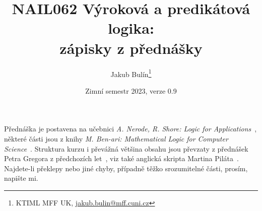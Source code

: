 \title{NAIL062 Výroková a predikátová logika: \\ zápisky z přednášky}
\author{Jakub Bulín\footnote{KTIML MFF UK, \href{mailto://jakub.bulin@mff.cuni.cz}{jakub.bulin@mff.cuni.cz}}}
\date{Zimní semestr 2023, verze 0.9}
\maketitle

Přednáška je postavena na učebnici \emph{A. Nerode, R. Shore: Logic for Applications}~\cite{nerode_logic_2012}, některé části jsou z knihy \emph{M. Ben-ari: Mathematical Logic for Computer Science}~\cite{ben-ari_mathematical_2012}. Struktura kurzu i převážná většina obsahu jsou převzaty z přednášek Petra Gregora z předchozích let~\cite{gregor_vyrokova_nodate}, viz také anglická skripta Martina Piláta~\cite{pilat_lecture_nodate}. Najdete-li překlepy nebo jiné chyby, případně těžko srozumitelné části, prosím, napište mi.

\tableofcontents